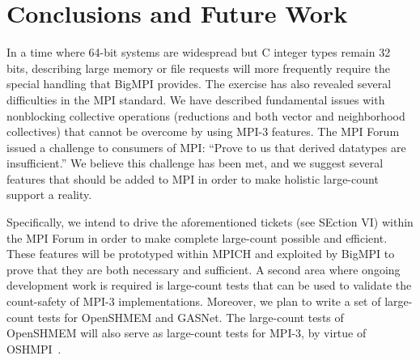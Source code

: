 
\section{Conclusions and Future Work}

In a time where 64-bit systems are widespread
but C integer types remain 32 bits, describing large memory or file requests
will more frequently require the special handling that BigMPI provides.
The exercise has also revealed several difficulties in the MPI standard.
We have described fundamental issues with nonblocking
collective operations (reductions and both vector and neighborhood collectives)
that cannot be overcome by using MPI-3 features.
The MPI Forum issued a challenge to consumers of MPI:
``Prove to us that derived datatypes are insufficient.''
We believe this challenge has been met, and we suggest 
several features
that should be added to MPI in order to make holistic large-count support a reality.

Specifically, we intend to drive the aforementioned tickets (see SEction VI) within the MPI Forum
in order to make complete large-count possible and efficient.
These features will be prototyped within MPICH and exploited by
BigMPI to prove that they are both necessary and sufficient.
A second area where ongoing development work is required is 
large-count tests that can be used to validate the count-safety of
MPI-3 implementations.
Moreover, we plan to write a set of large-count tests for 
OpenSHMEM and GASNet.  The large-count tests of OpenSHMEM
will also serve as large-count tests for MPI-3, by virtue of 
OSHMPI~\cite{hammond2014implementing}.
